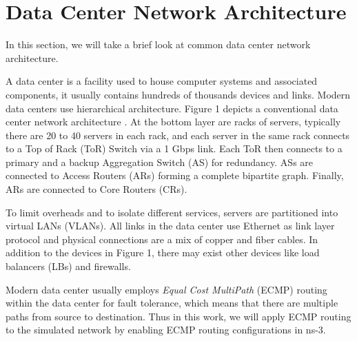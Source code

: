 \documentclass{sig-alternate-05-2015}
\begin{document}
\section{Data Center Network Architecture}
In this section, we will take a brief look at common data center network architecture.

A data center is a facility used to house computer systems and associated components, it usually contains hundreds of thousands devices and links. Modern data centers use hierarchical architecture. Figure 1 depicts a conventional data center network architecture \cite{gill2011understanding, greenberg2009vl2, herodotou2014scalable}. At the bottom layer are racks of servers, typically there are 20 to 40 servers in each rack, and each server in the same rack connects to a Top of Rack (ToR) Switch via a 1 Gbps link. Each ToR then connects to a primary and a backup Aggregation Switch (AS) for redundancy. ASs are connected to Access Routers (ARs) forming a complete bipartite graph. Finally, ARs are connected to Core Routers (CRs).

To limit overheads and to isolate different services, servers are partitioned into virtual LANs (VLANs). All links in the data center use Ethernet as link layer protocol and physical connections are a mix of copper and fiber cables. In addition to the devices in Figure 1, there may exist other devices like load balancers (LBs) and firewalls.

Modern data center usually employs \textit{Equal Cost MultiPath} (ECMP) routing within the data center for fault tolerance, which means that there are multiple paths from source to destination. Thus in this work, we will apply ECMP routing to the simulated network by enabling ECMP routing configurations in ns-3.
\end{document}
